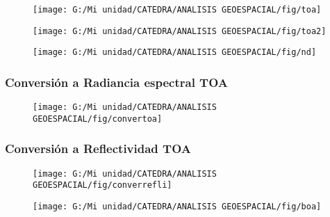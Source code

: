 \documentclass[14pt]{beamer}
\begin{document}
\begin{frame}
\scriptsize{}
  \begin{figure}
    \centering
    \texttt{[image: G:/Mi unidad/CATEDRA/ANALISIS GEOESPACIAL/fig/toa]}
     \end{figure}
\end{frame}
\begin{frame}
\scriptsize{}
  \begin{figure}
    \centering
    \texttt{[image: G:/Mi unidad/CATEDRA/ANALISIS GEOESPACIAL/fig/toa2]}
     \end{figure}
\end{frame}
\begin{frame}
\scriptsize{}
  \begin{figure}
    \centering
    \texttt{[image: G:/Mi unidad/CATEDRA/ANALISIS GEOESPACIAL/fig/nd]}
  \end{figure}
\end{frame}
\begin{frame}
\frametitle{Conversión a Radiancia espectral TOA}
\scriptsize{}
  \begin{figure}
    \centering
    \texttt{[image: G:/Mi unidad/CATEDRA/ANALISIS GEOESPACIAL/fig/convertoa]}
  \end{figure}
\end{frame}
\begin{frame}
\frametitle{Conversión a Reflectividad TOA}
\scriptsize{}
  \begin{figure}
    \centering
    \texttt{[image: G:/Mi unidad/CATEDRA/ANALISIS GEOESPACIAL/fig/converrefli]}
  \end{figure}
\end{frame}
\begin{frame}
\scriptsize{}
  \begin{figure}
    \centering
    \texttt{[image: G:/Mi unidad/CATEDRA/ANALISIS GEOESPACIAL/fig/boa]}
  \end{figure}
\end{frame}
\end{document}
